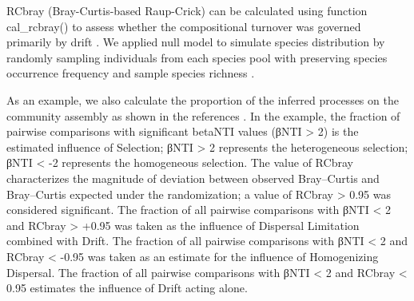 \documentclass[
]{book}
\newenvironment{Shaded}{\begin{snugshade}}{\end{snugshade}}
\newcommand{\AttributeTok}[1]{\textcolor[rgb]{0.13,0.29,0.53}{#1}}
\newcommand{\CommentTok}[1]{\textcolor[rgb]{0.56,0.35,0.01}{\textit{#1}}}
\newcommand{\ConstantTok}[1]{\textcolor[rgb]{0.56,0.35,0.01}{#1}}
\newcommand{\DecValTok}[1]{\textcolor[rgb]{0.00,0.00,0.81}{#1}}
\newcommand{\FunctionTok}[1]{\textcolor[rgb]{0.13,0.29,0.53}{\textbf{#1}}}
\newcommand{\NormalTok}[1]{#1}
\newcommand{\SpecialCharTok}[1]{\textcolor[rgb]{0.81,0.36,0.00}{\textbf{#1}}}
\newcommand{\StringTok}[1]{\textcolor[rgb]{0.31,0.60,0.02}{#1}}
\begin{document}
RCbray (Bray-Curtis-based Raup-Crick) can be calculated using function cal\_rcbray()
to assess whether the compositional turnover was governed primarily by drift \citep{Chase_null_2011}.
We applied null model to simulate species distribution by randomly sampling individuals from each
species pool with preserving species occurrence frequency and sample species richness \citep{Liu_Long_term_2017}.

\begin{Shaded}
\end{Shaded}

As an example, we also calculate the proportion of the inferred processes on the community assembly as shown in the references \citep{Stegen_Quantifying_2013, Liu_Long_term_2017}.
In the example, the fraction of pairwise comparisons with significant betaNTI values (\textbar βNTI\textbar{} \textgreater{} 2) is the estimated influence of Selection;
βNTI \textgreater{} 2 represents the heterogeneous selection; βNTI \textless{} -2 represents the homogeneous selection.
The value of RCbray characterizes the magnitude of deviation between observed Bray--Curtis and Bray--Curtis expected under the randomization;
a value of \textbar RCbray\textbar{} \textgreater{} 0.95 was considered significant.
The fraction of all pairwise comparisons with \textbar βNTI\textbar{} \textless{} 2 and RCbray \textgreater{} +0.95 was taken as the influence of Dispersal Limitation combined with Drift.
The fraction of all pairwise comparisons with \textbar βNTI\textbar{} \textless{} 2 and RCbray \textless{} -0.95 was taken as an estimate for the influence of Homogenizing Dispersal.
The fraction of all pairwise comparisons with \textbar βNTI\textbar{} \textless{} 2 and \textbar RCbray\textbar{} \textless{} 0.95 estimates the influence of Drift acting alone.

\begin{Shaded}
\end{Shaded}
\end{document}
